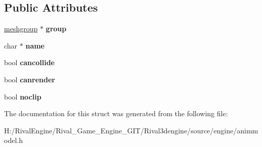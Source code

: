 \subsection*{Public Attributes}
\begin{DoxyCompactItemize}
\item 
\mbox{\label{structanimmodel_1_1mesh_a2a98dd6a648c9931de06289508bf5298}} 
\hyperlink{structanimmodel_1_1meshgroup}{meshgroup} $\ast$ {\bfseries group}
\item 
\mbox{\label{structanimmodel_1_1mesh_a79fe1da62857c70cf31b6aab0d52a653}} 
char $\ast$ {\bfseries name}
\item 
\mbox{\label{structanimmodel_1_1mesh_abc4839a30ec8b3991a9dbfdbcb3e8e3b}} 
bool {\bfseries cancollide}
\item 
\mbox{\label{structanimmodel_1_1mesh_a63b44ced5ac5b323818a239b52069012}} 
bool {\bfseries canrender}
\item 
\mbox{\label{structanimmodel_1_1mesh_a4ad8a0d4a2b8e40da01d42b4f7b44eb5}} 
bool {\bfseries noclip}
\end{DoxyCompactItemize}


The documentation for this struct was generated from the following file\+:\begin{DoxyCompactItemize}
\item 
H\+:/\+Rival\+Engine/\+Rival\+\_\+\+Game\+\_\+\+Engine\+\_\+\+G\+I\+T/\+Rival3dengine/source/engine/animmodel.\+h\end{DoxyCompactItemize}
